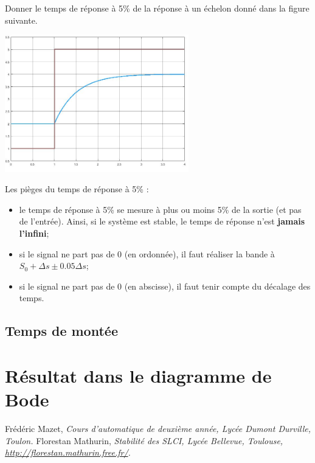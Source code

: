 \documentclass[10pt,fleqn]{article} %
\begin{document}
\begin{exemple}
Donner le temps de réponse à 5\% de la réponse à un échelon donné dans la figure suivante. 


\begin{minipage}[c]{.5\linewidth}
\begin{center}
%
\includegraphics[width=8cm]{images/tr.jpg}
\end{center}
\end{minipage} \hfill
\begin{minipage}[c]{.4\linewidth}
Les pièges du temps de réponse à 5\% :
\begin{itemize}
\item le temps de réponse à 5\% se mesure à plus ou moins 5\% de la sortie (et pas de l'entrée). Ainsi, si le système est stable, le temps de réponse n'est \textbf{jamais l'infini};
\item si le signal ne part pas de 0 (en ordonnée), il faut réaliser la bande à $S_0+\Delta s \pm 0.05\Delta s$;
\item si le signal ne part pas de 0 (en abscisse), il faut tenir compte du décalage des temps.
\end{itemize}
\end{minipage} 
\end{exemple}

\subsection{Temps de montée}

\section{Résultat dans le diagramme de Bode}
\begin{thebibliography}{2}
    Frédéric Mazet, {\it Cours d'automatique de deuxième année, Lycée Dumont Durville, Toulon.}
       Florestan Mathurin, {\it Stabilité des SLCI, Lycée Bellevue, Toulouse, \url{http://florestan.mathurin.free.fr/}.}



\end{thebibliography}
\end{document}

